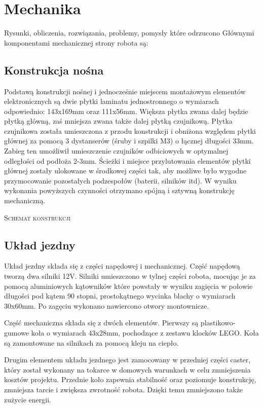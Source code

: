 \documentclass[11pt,a4paper]{article}
\begin{document}
\section{Mechanika}
Rysunki, obliczenia, rozwiązania, problemy, pomysły które odrzucono
  Głównymi komponentami mechanicznej strony robota są:
  \subsection{Konstrukcja nośna}
  Podstawą konstrukcji nośnej i jednocześnie miejscem montażowym elementów elektronicznych są dwie płytki laminatu jednostronnego o wymiarach odpowiednio: 143x169mm oraz 111x56mm. Większa płytka zwana dalej będzie płytką główną, zaś mniejsza zwana także dalej płytką czujnikową. Płytka czujnikowa została umieszczona z przodu konstrukcji i obniżona względem płytki głównej za pomocą 3 dystanserów (śruby i szpilki M3) o łącznej długości 33mm. Zabieg ten umożliwił umieszczenie czujników odbiciowych w optymalnej odległości od podłoża 2-3mm.
  Ścieżki i miejsce przylutowania elementów płytki głównej zostały ulokowane w środkowej części tak, aby możliwe było wygodne przymocowanie pozostałych podzespołów (baterii, silników itd).
  W wyniku wykonania powyższych czynności otrzymano spójną i sztywną konstrukcję mechaniczną.
  
  \textsc{Schemat konstrukcji}
  
  \subsection{Układ jezdny}
  Układ jezdny składa się z części napędowej i mechanicznej. Część napędową tworzą dwa silniki 12V. Silniki umieszczono w tylnej części robota, mocując je za pomocą aluminiowych kątowników które powstały w wyniku zagięcia w połowie długości pod kątem 90 stopni, prostokątnego wycinka blachy o wymiarach 30x60mm. Po zagęciu wykonano nawiercono otwory montownicze.
  
  Część mechaniczna składa się z dwóch elementów. Pierwszy są plastikowo-gumowe koła o wymiarach 43x28mm, pochodzące z zestawu klocków LEGO. Koła są zamontowane na silnikach za pomocą kleju na ciepło.
  
Drugim elementem układu jezdnego jest zamocowany w przedniej części caster, który został wykonany na tokarce w domowych warunkach w celu zmniejszenia kosztów projektu. Przednie koło zapewnia stabilność oraz poziomuje konstrukcję, zmniejsza tarcie i zwiększa zwrotność robota. Dzięki temu zmniejszono także zużycie energii.
  
\end{document}
